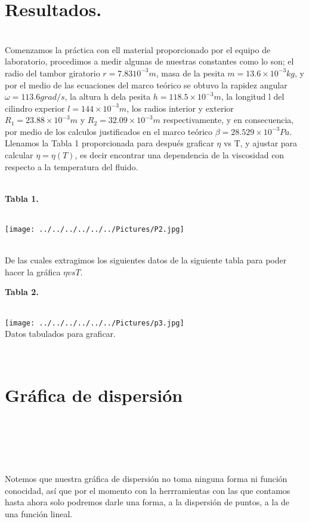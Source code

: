 \documentclass[10pt,a4paper]{article}
\begin{document}
\section*{Resultados.}
\\
Comenzamos la pr\'{a}ctica con ell material proporcionado por el equipo de laboratorio, procedimos a medir algunas de nuestras constantes como lo son; el radio del tambor giratorio $r=7.83{ 10 }^{ -3 } m $, masa de la pesita $m=13.6\times { 10 }^{ -3 } kg$, y por el medio de las ecuaciones del marco te\'{o}rico se obtuvo la rapidez angular $\omega=113.6 grad/s$, la altura h dela pesita  $h=118.5\times { 10 }^{ -3 } m$, la longitud l del cilindro experior $l=144\times { 10 }^{ -3 }m $, los radios interior y exterior  $R_{1}=23.88\times { 10 }^{ -3 } m$ y $R_{2}=32.09\times { 10 }^{ -3 } m$ respectivamente, y en consecuencia, por medio de los calculos justificados en el marco te\'{o}rico $\beta=28.529\times { 10 }^{ -3 } Pa$. Llenamos la Tabla 1 proporcionada para despu\'{e}s  graficar $\eta $ vs T, y ajustar para calcular  $\eta= \eta (T)$, es decir encontrar una dependencia de la viscosidad con respecto a la temperatura del fluido.
\\
\\

\begin{figure 2}
\caption{\textbf{Tabla 1.}}
\\
\centering
\texttt{[image: ../../../../../../Pictures/P2.jpg]}     
\\
\end{figure 2}
\\
\medskip
De las cuales extragimos los siguientes datos de la siguiente tabla para poder hacer la gr\'{a}fica $\eta vs T$.
\medskip
\\
\begin{figure 3}
\caption{\textbf{Tabla 2.}}
\\
\centering
\texttt{[image: ../../../../../../Pictures/p3.jpg]} 
\\
\caption{Datos tabulados para graficar.}
\end{figure 3}
\\
\section*{Gr\'{a}fica de dispersi\'{o}n}
\\
\\
\begin{figure 5}

\centering
\texttt{[image: ../../../../../../Pictures/FDHFJDFHS.jpg]} 
\\
\caption{Gr\'{a}fico de dispersi\'o}n para los datos de la viscosidad variando la temperatura.}
\end{figure 5}
\\
\\
Notemos que nuestra gr\'{a}fica de dispersi\'{o}n no toma ninguna forma ni funci\'{o}n conocidad, as\'{i} que por el momento con la herrramientas con las que contamos hasta ahora solo podremos darle una forma, a la dispersi\'{o}n de puntos, a la de una funci\'{o}n lineal.
\\ 
\end{document}
